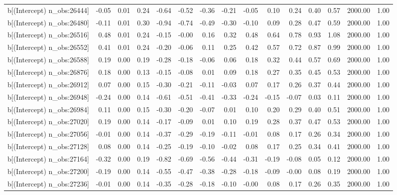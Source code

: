 \begin{table}[ht]
\begin{tabular}{rrrrrrrrrrrrrrr}
  b[(Intercept) n\_obs:26444] & -0.05 & 0.01 & 0.24 & -0.64 & -0.52 & -0.36 & -0.21 & -0.05 & 0.10 & 0.24 & 0.40 & 0.57 & 2000.00 & 1.00 \\ 
  b[(Intercept) n\_obs:26480] & -0.11 & 0.01 & 0.30 & -0.94 & -0.74 & -0.49 & -0.30 & -0.10 & 0.09 & 0.28 & 0.47 & 0.59 & 2000.00 & 1.00 \\ 
  b[(Intercept) n\_obs:26516] & 0.48 & 0.01 & 0.24 & -0.15 & -0.00 & 0.16 & 0.32 & 0.48 & 0.64 & 0.78 & 0.93 & 1.08 & 2000.00 & 1.00 \\ 
  b[(Intercept) n\_obs:26552] & 0.41 & 0.01 & 0.24 & -0.20 & -0.06 & 0.11 & 0.25 & 0.42 & 0.57 & 0.72 & 0.87 & 0.99 & 2000.00 & 1.00 \\ 
  b[(Intercept) n\_obs:26588] & 0.19 & 0.00 & 0.19 & -0.28 & -0.18 & -0.06 & 0.06 & 0.18 & 0.32 & 0.44 & 0.57 & 0.69 & 2000.00 & 1.00 \\ 
  b[(Intercept) n\_obs:26876] & 0.18 & 0.00 & 0.13 & -0.15 & -0.08 & 0.01 & 0.09 & 0.18 & 0.27 & 0.35 & 0.45 & 0.53 & 2000.00 & 1.00 \\ 
  b[(Intercept) n\_obs:26912] & 0.07 & 0.00 & 0.15 & -0.30 & -0.21 & -0.11 & -0.03 & 0.07 & 0.17 & 0.26 & 0.37 & 0.44 & 2000.00 & 1.00 \\ 
  b[(Intercept) n\_obs:26948] & -0.24 & 0.00 & 0.14 & -0.61 & -0.51 & -0.41 & -0.33 & -0.24 & -0.15 & -0.07 & 0.03 & 0.11 & 2000.00 & 1.00 \\ 
  b[(Intercept) n\_obs:26984] & 0.11 & 0.00 & 0.15 & -0.30 & -0.20 & -0.07 & 0.01 & 0.10 & 0.20 & 0.29 & 0.40 & 0.51 & 2000.00 & 1.00 \\ 
  b[(Intercept) n\_obs:27020] & 0.19 & 0.00 & 0.14 & -0.17 & -0.09 & 0.01 & 0.10 & 0.19 & 0.28 & 0.37 & 0.47 & 0.53 & 2000.00 & 1.00 \\ 
  b[(Intercept) n\_obs:27056] & -0.01 & 0.00 & 0.14 & -0.37 & -0.29 & -0.19 & -0.11 & -0.01 & 0.08 & 0.17 & 0.26 & 0.34 & 2000.00 & 1.00 \\ 
  b[(Intercept) n\_obs:27128] & 0.08 & 0.00 & 0.14 & -0.25 & -0.19 & -0.10 & -0.02 & 0.08 & 0.17 & 0.25 & 0.34 & 0.41 & 2000.00 & 1.00 \\ 
  b[(Intercept) n\_obs:27164] & -0.32 & 0.00 & 0.19 & -0.82 & -0.69 & -0.56 & -0.44 & -0.31 & -0.19 & -0.08 & 0.05 & 0.12 & 2000.00 & 1.00 \\ 
  b[(Intercept) n\_obs:27200] & -0.19 & 0.00 & 0.14 & -0.55 & -0.47 & -0.38 & -0.28 & -0.18 & -0.09 & -0.00 & 0.08 & 0.19 & 2000.00 & 1.00 \\ 
  b[(Intercept) n\_obs:27236] & -0.01 & 0.00 & 0.14 & -0.35 & -0.28 & -0.18 & -0.10 & -0.00 & 0.08 & 0.17 & 0.26 & 0.35 & 2000.00 & 1.00 \\ 

\end{tabular}
\end{table}
